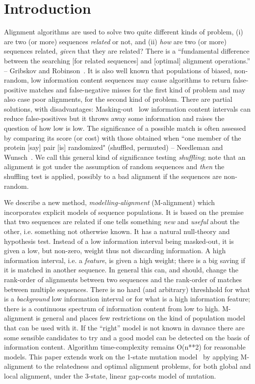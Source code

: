 \documentclass[letterpaper,11pt,oneside]{article}
\begin{document}
\section{Introduction} \label{sec:Intro}

Alignment algorithms are used to solve two quite different kinds of problem,
(i) are two (or more) sequences {\em related} or not, and
(ii) {\em how} are two (or more) sequences related,
{\em given} that they are related?
There is a ``fundamental difference between
the searching [for related sequences] and [optimal] alignment operations.''
-- Gribskov and Robinson~\cite{gribskov96}.
It is also well known that populations of biased, non-random,
low information content sequences may cause algorithms
to return false-positive matches and false-negative misses for
the first kind of problem and may also case poor alignments,
for the second kind of problem.
There are partial solutions, with disadvantages:
Masking-out~\cite{claverie93} low information content intervals
can reduce false-positives but it throws away some information and
raises the question of how low is low.
The significance of a possible match is often assessed by comparing
its score (or cost) with those obtained when ``one member of
the protein [say] pair [is] randomized"
(shuffled, permuted) -- Needleman and Wunsch~\cite{needleman70}.
We call this general kind of significance testing {\em shuffling};
note that an alignment is got under the assumption of random sequences
and {\em then} the shuffling test is applied, possibly to a bad alignment
if the sequences are non-random.

We describe a new method, {\em modelling-alignment} (M-alignment)
which incorporates explicit models of sequence populations.
It is based on the premise that two sequences are related if one tells
something {\em new} and {\em useful} about the other,
i.e. something not otherwise known.
It has a natural null-theory and hypothesis test.
Instead of a low information interval being masked-out, it is given
a low, but non-zero, weight thus not discarding information.
A high information interval, i.e. a {\em feature}, is given a high weight;
there is a big saving if it is matched in another sequence.
In general this can, and should, change the rank-order of alignments
between two sequences and the rank-order of matches between multiple sequences.
There is no hard (and arbitrary) threshhold for what is
a {\em background} low information interval or
for what is a high information feature;
there is a continuous spectrum of information content from low to high.
M-alignment is general and places few restrictions on the kind
of population model that can be used with it.
If the ``right'' model is not known in davance
there are some sensible candidates to try
and a good model can be detected on the basis of information content.
Algorithm time-complexity remains O(n**2) for reasonable models.
This paper extends work on the 1-state mutation model~\cite{allison99}
by applying M-alignment to
the relatedness and optimal alignment problems,
for both global and local alignment,
under the 3-state, linear gap-costs model \cite{gotoh82} of mutation.
\end{document}
